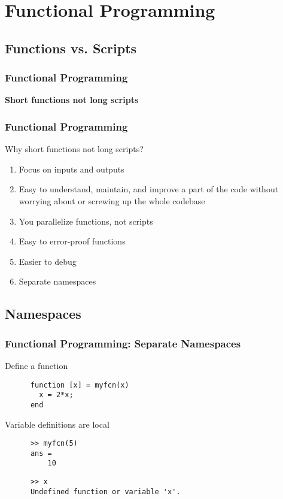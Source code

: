 \documentclass{beamer}
\begin{document}
\section{Functional Programming}

\subsection{Functions vs. Scripts}
  \begin{frame}[fragile]
    \frametitle{Functional Programming}

    \begin{centering}
    \begin{center}
      \huge
      \textbf{Short functions not long scripts}
    \end{center}
    \end{centering}
	\end{frame}


  \begin{frame}[fragile]
    \frametitle{Functional Programming}

    Why short functions not long scripts?
    \begin{enumerate}
      \item Focus on inputs and outputs
      \item Easy to understand, maintain, and improve a part of the code
        without worrying about or screwing up the whole codebase\pause
      \item You parallelize functions, not scripts\pause
      \item Easy to error-proof functions\pause
      \item Easier to debug\pause
      \item Separate namespaces
    \end{enumerate}
	\end{frame}

\subsection{Namespaces}

  \begin{frame}[fragile]
    \frametitle{Functional Programming: Separate Namespaces}

    Define a function
    \begin{lstlisting}
      function [x] = myfcn(x)
        x = 2*x;
      end
    \end{lstlisting}\pause
    Variable definitions are local
    \begin{lstlisting}
      >> myfcn(5)
      ans =
          10
    \end{lstlisting}\pause
    \lstset{style=matlabNoBlue}
    \begin{lstlisting}
      >> x
      Undefined function or variable 'x'.
    \end{lstlisting}
    \lstset{style=matlab}
	\end{frame}
\end{document}

